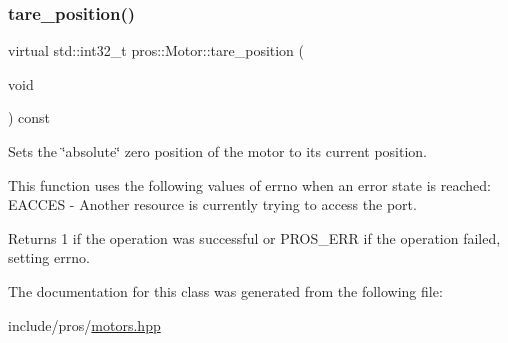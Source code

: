 \subsubsection{\texorpdfstring{tare\_position()}{tare\_position()}}
{\footnotesize\ttfamily virtual std\+::int32\+\_\+t pros\+::\+Motor\+::tare\+\_\+position (\begin{DoxyParamCaption}\item[{void}]{ }\end{DoxyParamCaption}) const\hspace{0.3cm}{\ttfamily [virtual]}}



Sets the \char`\"{}absolute\char`\"{} zero position of the motor to its current position. 

This function uses the following values of errno when an error state is reached\+: E\+A\+C\+C\+ES -\/ Another resource is currently trying to access the port.

\begin{DoxyReturn}{Returns}
1 if the operation was successful or P\+R\+O\+S\+\_\+\+E\+RR if the operation failed, setting errno. 
\end{DoxyReturn}


The documentation for this class was generated from the following file\+:\begin{DoxyCompactItemize}
\item 
include/pros/\mbox{\hyperlink{motors_8hpp}{motors.\+hpp}}\end{DoxyCompactItemize}
